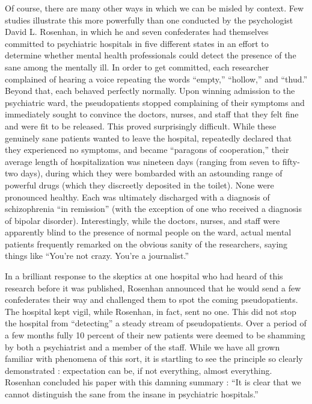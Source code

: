 \documentclass[a4paper,14pt]{extbook}
\begin{document}
Of course, there are many other ways in which we can be misled by context.
Few studies illustrate this more powerfully than one conducted by the psychologist David L. Rosenhan, in which he and seven confederates had themselves committed to psychiatric hospitals in five different states in an effort to determine whether mental health professionals could detect the presence of the sane among the mentally ill.
In order to get committed, each researcher complained of hearing a voice repeating the words ``empty,'' ``hollow,'' and ``thud.''
Beyond that, each behaved perfectly normally.
Upon winning admission to the psychiatric ward, the pseudopatients stopped complaining of their symptoms and immediately sought to convince the doctors, nurses, and staff that they felt fine and were fit to be released.
This proved surprisingly difficult.
While these genuinely sane patients wanted to leave the hospital, repeatedly declared that they experienced no symptoms, and became ``paragons of cooperation,'' their average length of hospitalization was nineteen days (ranging from seven to fifty-two days), during which they were bombarded with an astounding range of powerful drugs (which they discreetly deposited in the toilet).
None were pronounced healthy.
Each was ultimately discharged with a diagnosis of schizophrenia ``in remission'' (with the exception of one who received a diagnosis of bipolar disorder).
Interestingly, while the doctors, nurses, and staff were apparently blind to the presence of normal people on the ward, actual mental patients frequently remarked on the obvious sanity of the researchers, saying things like ``You’re not crazy. You’re a journalist.”

In a brilliant response to the skeptics at one hospital who had heard of this research before it was published, Rosenhan announced that he would send a few confederates their way and challenged them to spot the coming pseudopatients.
The hospital kept vigil, while Rosenhan, in fact, sent no one.
This did not stop the hospital from ``detecting'' a steady stream of pseudopatients.
Over a period of a few months fully 10 percent of their new patients were deemed to be shamming by both a psychiatrist and a member of the staff.
While we have all grown familiar with phenomena of this sort, it is startling to see the principle so clearly demonstrated :
expectation can be, if not everything, almost everything.
Rosenhan concluded his paper with this damning summary :
``It is clear that we cannot distinguish the sane from the insane in psychiatric hospitals.''
\end{document}
